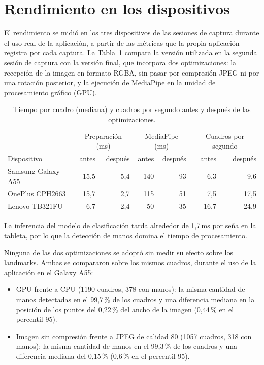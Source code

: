 \section{Rendimiento en los dispositivos}
\label{sec:res-rendimiento}

El rendimiento se midió en los tres dispositivos de las sesiones de captura durante el uso real de la aplicación, a partir de las métricas que la propia aplicación registra por cada captura. La Tabla~\ref{tab:rendimiento} compara la versión utilizada en la segunda sesión de captura con la versión final, que incorpora dos optimizaciones: la recepción de la imagen en formato RGBA, sin pasar por compresión JPEG ni por una rotación posterior, y la ejecución de MediaPipe en la unidad de procesamiento gráfico (GPU).

\begin{table}[h]
    \centering
    \small
    \begin{tabular}{lrrrrrr}
        \toprule
        & \multicolumn{2}{c}{Preparación (ms)} & \multicolumn{2}{c}{MediaPipe (ms)} & \multicolumn{2}{c}{Cuadros por segundo} \\
        Dispositivo & antes & después & antes & después & antes & después \\
        \midrule
        Samsung Galaxy A55 & 15,5 & 5,4 & 140 & 93 & 6,3 & 9,6 \\
        OnePlus CPH2663 & 15,7 & 2,7 & 115 & 51 & 7,5 & 17,5 \\
        Lenovo TB321FU & 6,7 & 2,4 & 50 & 35 & 16,7 & 24,9 \\
        \bottomrule
    \end{tabular}
    \caption{Tiempo por cuadro (mediana) y cuadros por segundo antes y después de las optimizaciones.}
    \label{tab:rendimiento}
\end{table}

La inferencia del modelo de clasificación tarda alrededor de 1,7\,ms por seña en la tableta, por lo que la detección de manos domina el tiempo de procesamiento.

Ninguna de las dos optimizaciones se adoptó sin medir su efecto sobre los landmarks. Ambas se compararon sobre los mismos cuadros, durante el uso de la aplicación en el Galaxy A55:

\begin{itemize}
    \item GPU frente a CPU (1190 cuadros, 378 con manos): la misma cantidad de manos detectadas en el 99,7\,\% de los cuadros y una diferencia mediana en la posición de los puntos del 0,22\,\% del ancho de la imagen (0,44\,\% en el percentil 95).
    \item Imagen sin compresión frente a JPEG de calidad 80 (1057 cuadros, 318 con manos): la misma cantidad de manos en el 99,3\,\% de los cuadros y una diferencia mediana del 0,15\,\% (0,6\,\% en el percentil 95).
\end{itemize}

